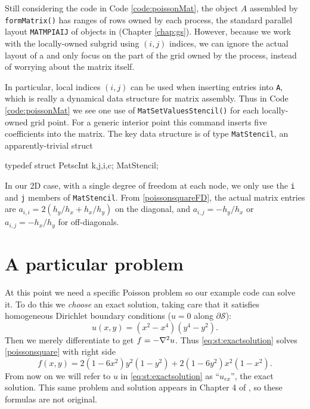 Still considering the code in Code \ref{code:poissonMat}, the \pMat object $A$ assembled by \texttt{formMatrix()}  has ranges of rows owned by each process, the standard parallel layout \texttt{MATMPIAIJ} of \pMat objects in \PETSc (Chapter \ref{chap:gs}).  However, because we work with the locally-owned subgrid using $(i,j)$ indices, we can ignore the actual layout of a \pMat and only focus on the part of the grid owned by the process, instead of worrying about the matrix itself.

In particular, local indices $(i,j)$ can be used when inserting entries into \pMat \texttt{A}, which is really a dynamical data structure for matrix assembly.  Thus in Code \ref{code:poissonMat} we see one use of \texttt{MatSetValuesStencil()} for each locally-owned grid point.  For a generic interior point this command inserts five coefficients into the matrix.  The key data structure is of type \texttt{MatStencil}, an apparently-trivial struct
\begin{code}
typedef struct {
  PetscInt k,j,i,c;
} MatStencil;
\end{code}
In our 2D case, with a single degree of freedom at each node, we only use the \texttt{i} and \texttt{j} members of \texttt{MatStencil}.  From \eqref{poissonsquareFD}, the actual matrix entries are $a_{i,i} = 2\left(h_y/h_x + h_x/h_y\right)$ on the diagonal, and $a_{i,j} = -h_y/h_x$ or $a_{i,j} = -h_x/h_y$ for off-diagonals.


\section{A particular problem}

At this point we need a specific Poisson problem so our example code can solve it.  To do this we \emph{choose} an exact solution, taking care that it satisfies homogeneous Dirichlet boundary conditions ($u=0$ along $\partial \mathcal{S}$):
\begin{equation}
u(x,y) = (x^2 - x^4) (y^4 - y^2). \label{eq:st:exactsolution}
\end{equation}
Then we merely differentiate to get $f = -\nabla^2 u$.  Thus \eqref{eq:st:exactsolution} solves \eqref{poissonsquare} with right side
\begin{equation}
f(x,y) = 2 (1 - 6 x^2) y^2 (1 - y^2) + 2 (1 - 6 y^2) x^2 (1 - x^2).\label{manufacturedf}
\end{equation}
From now on we will refer to $u$ in \eqref{eq:st:exactsolution} as ``$u_{ex}$'', the exact solution.  This same problem and solution appears in Chapter 4 of \citep{Briggsetal2000}, so these formulas are not original. %

